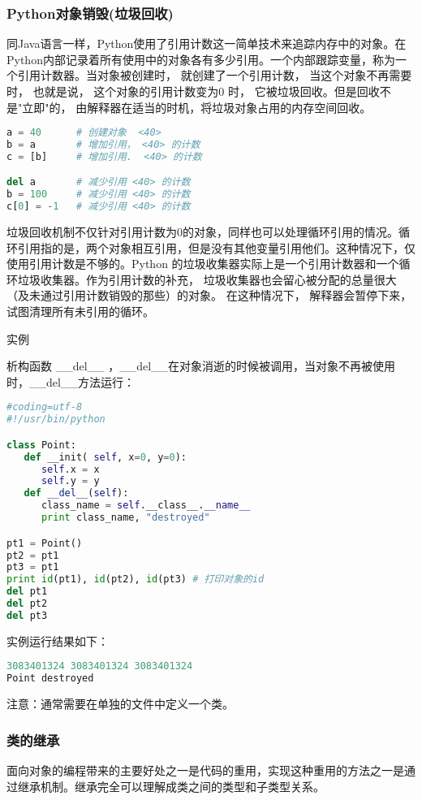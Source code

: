 \subsubsection{Python对象销毁(垃圾回收)}
同Java语言一样，Python使用了引用计数这一简单技术来追踪内存中的对象。在Python内部记录着所有使用中的对象各有多少引用。一个内部跟踪变量，称为一个引用计数器。当对象被创建时， 就创建了一个引用计数， 当这个对象不再需要时， 也就是说， 这个对象的引用计数变为0 时， 它被垃圾回收。但是回收不是"立即"的， 由解释器在适当的时机，将垃圾对象占用的内存空间回收。
\begin{lstlisting}[language=Python]
a = 40      # 创建对象  <40>
b = a       # 增加引用， <40> 的计数
c = [b]     # 增加引用.  <40> 的计数

del a       # 减少引用 <40> 的计数
b = 100     # 减少引用 <40> 的计数
c[0] = -1   # 减少引用 <40> 的计数
\end{lstlisting}

垃圾回收机制不仅针对引用计数为0的对象，同样也可以处理循环引用的情况。循环引用指的是，两个对象相互引用，但是没有其他变量引用他们。这种情况下，仅使用引用计数是不够的。Python 的垃圾收集器实际上是一个引用计数器和一个循环垃圾收集器。作为引用计数的补充， 垃圾收集器也会留心被分配的总量很大（及未通过引用计数销毁的那些）的对象。 在这种情况下， 解释器会暂停下来， 试图清理所有未引用的循环。

实例

析构函数 \_\_del\_\_ ，\_\_del\_\_在对象消逝的时候被调用，当对象不再被使用时，\_\_del\_\_方法运行：
\begin{lstlisting}[language=Python]
#coding=utf-8
#!/usr/bin/python

class Point:
   def __init( self, x=0, y=0):
      self.x = x
      self.y = y
   def __del__(self):
      class_name = self.__class__.__name__
      print class_name, "destroyed"

pt1 = Point()
pt2 = pt1
pt3 = pt1
print id(pt1), id(pt2), id(pt3) # 打印对象的id
del pt1
del pt2
del pt3
\end{lstlisting}
实例运行结果如下：
\begin{lstlisting}[language=Python]
3083401324 3083401324 3083401324
Point destroyed
\end{lstlisting}
注意：通常需要在单独的文件中定义一个类。



\subsubsection{类的继承}
面向对象的编程带来的主要好处之一是代码的重用，实现这种重用的方法之一是通过继承机制。继承完全可以理解成类之间的类型和子类型关系。

